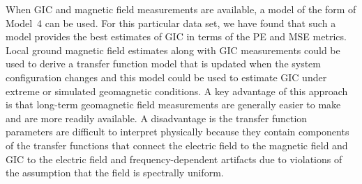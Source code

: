\documentclass[draft,linenumbers]{agujournal2018}
\providecommand{\DIFdelbegin}{} %
\begin{document}
When GIC and magnetic field measurements are available, a model of the form of Model~4 can be used. For this particular data set, we have found that such a model provides the best estimates of GIC in terms of the PE and MSE metrics. Local ground magnetic field estimates along with GIC measurements could be used to derive a transfer function model that is updated when the system configuration changes and this model could be used to estimate GIC under extreme or simulated geomagnetic conditions. A key advantage of this approach is that long-term geomagnetic field measurements are generally easier to make and are more readily available. A disadvantage is the transfer function parameters are difficult to interpret physically because they contain components of the transfer functions that connect the electric field to the magnetic field and GIC to the electric field and frequency-dependent artifacts due to violations of the assumption that the field is spectrally uniform.

\DIFdelbegin %



\end{document}
